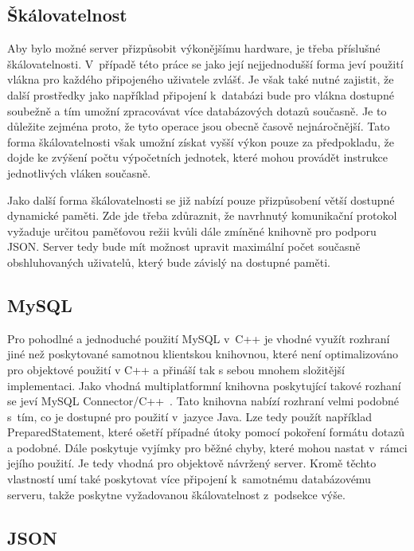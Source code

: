 \documentclass[thesis=B,czech]{FITthesis}[2013/10/20]
\begin{document}
\subsection{Škálovatelnost}

Aby bylo možné server přizpůsobit výkonějšímu hardware, je třeba příslušné škálovatelnosti. V~případě této práce se jako její nejjednodušší forma jeví použití vlákna pro každého připojeného uživatele zvlášť. Je však také nutné zajistit, že další prostředky jako například připojení k~databázi bude pro vlákna dostupné soubežně a tím umožní zpracovávat více databázových dotazů současně. Je to důležite zejména proto, že tyto operace jsou obecně časově nejnáročnější. Tato forma škálovatelnosti však umožní získat vyšší výkon pouze za předpokladu, že dojde ke zvýšení počtu výpočetních jednotek, které mohou provádět instrukce jednotlivých vláken současně.

Jako další forma škálovatelnosti se již nabízí pouze přizpůsobení větší dostupné dynamické paměti. Zde jde třeba zdůraznit, že navrhnutý komunikační protokol vyžaduje určitou paměťovou režii kvůli dále zmíněné knihovně pro podporu JSON. Server tedy bude mít možnost upravit maximální počet současně obshluhovaných uživatelů, který bude závislý na dostupné paměti.

\subsection{MySQL}

Pro pohodlné a jednoduché použití MySQL v~C++ je vhodné využít rozhraní jiné než poskytované samotnou klientskou knihovnou, které není optimalizováno pro objektové použití v C++ a přináší tak s sebou mnohem složitější implementaci. Jako vhodná multiplatformní knihovna poskytující takové rozhaní se jeví MySQL Connector/C++~\cite{mysqlconn}. Tato knihovna nabízí rozhraní velmi podobné s~tím, co je dostupné pro použití v~jazyce Java. Lze tedy použít například PreparedStatement, které ošetří případné útoky pomocí pokoření formátu dotazů a podobné. Dále poskytuje vyjímky pro běžné chyby, které mohou nastat v~rámci jejího použití. Je tedy vhodná pro objektově návržený server. Kromě těchto vlastností umí také poskytovat více připojení k~samotnému databázovému serveru, takže poskytne vyžadovanou škálovatelnost z~podsekce výše.

\subsection{JSON}
\end{document}
